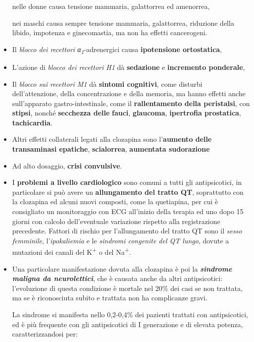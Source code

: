 \documentclass[]{article}
\begin{document}
\begin{itemize}
  nelle donne causa tensione mammaria, galattorrea ed amenorrea,

  nei maschi causa sempre tensione mammaria, galattorrea, riduzione
  della libido, impotenza e ginecomastia, ma non ha effetti cancerogeni.
\item
  Il \emph{blocco dei recettori α\textsubscript{1}}-adrenergici causa
  \textbf{ipotensione ortostatica},
\item
  L'azione di \emph{blocco dei recettori H1} dà \textbf{sedazione} e
  \textbf{incremento ponderale},
\item
  Il \emph{blocco sui recettori M1} dà \textbf{sintomi cognitivi}, come
  disturbi dell'attenzione, della concentrazione e della memoria, ma
  hanno effetti anche sull'apparato gastro-intestinale, come il
  \textbf{rallentamento della peristalsi}, con \textbf{stipsi}, nonché
  \textbf{secchezza delle} \textbf{fauci}, \textbf{glaucoma},
  \textbf{ipertrofia prostatica}, \textbf{tachicardia}.
\item
  Altri effetti collaterali legati alla clozapina sono l'\textbf{aumento
  delle transaminasi epatiche}, \textbf{scialorrea}, \textbf{aumentata
  sudorazione}
\item
  Ad alto dosaggio, \textbf{crisi convulsive}.
\item
  I \textbf{problemi a livello cardiologico} sono comuni a tutti gli
  antipsicotici, in particolare si può avere un \textbf{allungamento del
  tratto QT}, soprattutto con la clozapina ed alcuni nuovi composti,
  come la quetiapina, per cui è consigliato un monitoraggio con ECG
  all'inizio della terapia ed uno dopo 15 giorni con calcolo
  dell'eventuale variazione rispetto alla registrazione precedente.
  Fattori di rischio per l'allungamento del tratto QT sono il
  \emph{sesso femminile}, l'\emph{ipokaliemia} e le \emph{sindromi
  congenite del QT lungo}, dovute a mutazioni dei canali del
  K\textsuperscript{+} o del Na\textsuperscript{+}.
\item
  Una particolare manifestazione dovuta alla clozapina è poi la
  \textbf{\emph{sindrome maligna da neurolettici}}, che è causata anche
  da altri antipsicotici: l'evoluzione di questa condizione è mortale
  nel 20\% dei casi se non trattata, ma se è riconosciuta subito e
  trattata non ha complicanze gravi.

  La sindrome si manifesta nello 0,2-0,4\% dei pazienti trattati con
  antipsicotici, ed è più frequente con gli antipsicotici di I
  generazione e di elevata potenza, caratterizzandosi per:
\end{itemize}
\end{document}
